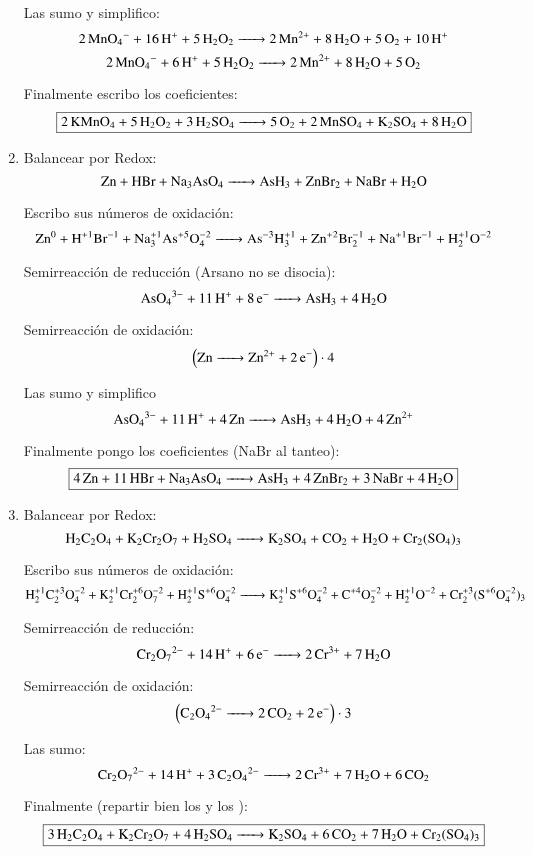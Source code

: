 \begin{enumerate}
Las sumo y simplifico:
$$\ce{
2MnO4^- + 16H^+ + 5H2O2 ->
2Mn^{2+} + 8H2O + 5O2 + 10H^+
}$$
$$\ce{
2MnO4^- + 6H^+ + 5H2O2 ->
2Mn^{2+} + 8H2O + 5O2
}$$

Finalmente escribo los coeficientes:
$$\fbox{\ce{2KMnO4 + 5H2O2 + 3H2SO4 -> 5O2 + 2MnSO4 + K2SO4 + 8H2O}}$$


\item Balancear por Redox:
$$\ce{
Zn + HBr + Na3AsO4 -> AsH3 + ZnBr2 + NaBr + H2O
}$$

Escribo sus números de oxidación:
$$\ce{
Zn^0 + H^{+1}Br^{-1} + Na^{+1}3As^{+5}O^{-2}4 ->
As^{-3}H^{+1}3 + Zn^{+2}Br^{-1}2 + Na^{+1}Br^{-1} + H^{+1}2O^{-2}
}$$


\begin{multicols}{2}
    Semirreacción de reducción (Arsano no se disocia):
    $$\ce{
    AsO4^{3-} + 11H^+ + 8e^- ->
    AsH3 + 4H2O
    }$$
    
    Semirreacción de oxidación:
    $$\left(\ce{
    Zn ->
    Zn^{2+} + 2e^-
    }\right) \cdot 4$$
\end{multicols}

Las sumo y simplifico
$$\ce{
AsO4^{3-} + 11H^+ + 4Zn ->
AsH3 + 4H2O + 4Zn^{2+}
}$$

Finalmente pongo los coeficientes (NaBr al tanteo):
$$\fbox{\ce{
4Zn + 11HBr + Na3AsO4 ->
AsH3 + 4ZnBr2 + 3NaBr + 4H2O
}}$$


\item 
Balancear por Redox:
$$\ce{
H2C2O4 + K2Cr2O7 + H2SO4 ->
K2SO4 + CO2 + H2O + Cr2(SO4)3
}$$

Escribo sus números de oxidación:
$$\ce{
H^{+1}2C^{+3}2O^{-2}4 + K^{+1}2Cr^{+6}2O^{-2}7 + H^{+1}2S^{+6}O^{-2}4 ->
K^{+1}2S^{+6}O^{-2}4 + C^{+4}O^{-2}2 + H^{+1}2O^{-2} + Cr^{+3}2(S^{+6}O^{-2}4)3
}$$


\begin{multicols}{2}
Semirreacción de reducción:
$$\ce{
Cr2O7^{2-} + 14H^+ + 6e^- ->
2Cr^{3+} + 7H2O
}$$

Semirreacción de oxidación:
$$\left(\ce{
C2O4^{2-} ->
2CO2 + 2e^-
}\right) \cdot 3$$
\end{multicols}

Las sumo:
$$\ce{
Cr2O7^{2-} + 14H^+ + 3C2O4^{2-} ->
2Cr^{3+} + 7H2O + 6CO2
}$$

Finalmente (repartir bien los  y los ):
$$\fbox{\ce{
3H2C2O4 + K2Cr2O7 + 4H2SO4 ->
K2SO4 + 6CO2 + 7H2O + Cr2(SO4)3
}}$$

\end{enumerate}
